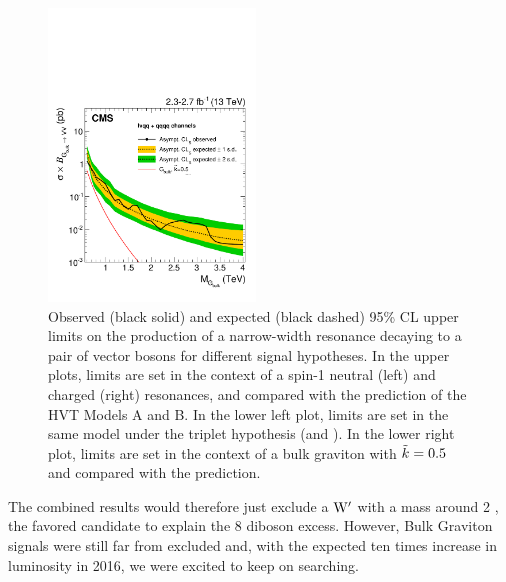 \begin{figure}[!htb]
     \includegraphics[width=0.49\textwidth]{figures/analysis/search1/B2G-16-004//EXOVVbulkg_ALL13_UL_Asymptotic_log.pdf}
\caption{Observed (black solid) and expected (black dashed) 95\% CL upper limits on the production of a narrow-width resonance decaying to 
a pair of vector bosons for different signal hypotheses. In the upper plots, limits are set in the context of a spin-1 neutral \PZpr (left) and charged \PWpr (right)
resonances, and compared with the prediction of the HVT Models A and B. In the lower left plot, limits are set in the same model under the triplet hypothesis (\PWpr and \PZpr).
In the lower right plot, limits are set in the context of a bulk graviton with $\tilde{k} =0.5$ and compared with the prediction.
}
\label{fig:searchI:limitCombined}
\end{figure}

\par
The combined results would therefore just exclude a $\mathrm{W}^\prime$ with a mass around 2 \TeV, the favored candidate to explain the 8 \TeV diboson excess.
However, Bulk Graviton signals were still far from excluded and, with the expected ten times increase in luminosity in 2016, we were excited to keep on searching.


